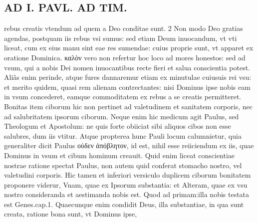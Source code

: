 \documentclass{article}
\begin{document}
\begin{pages}
\section*{AD I. PAVL. AD TIM. }
\marginpar{[ p.196 ]}\pstart rebus creatis vtendum ad quem a Deo conditae sunt. 2 Non modo Deo gratias agendas, postquam iis rebus vsi sumus: sed etiam Deum inuocandum, vt vti liceat, cum ex eius manu sint eae res sumendae: cuius proprie sunt, vt apparet ex oratione Dominica. καλὸν vero non refertur hoc loco ad mores honestos: sed ad vsum, qui a nobis Dei nomen inuocantibus recte fieri et salua conscientia potest. Aliâs enim perinde, atque fures dannaremur etiam ex minutulae cuiusuis rei vsu: et merito quidem, quasi rem alienam contrectantes: nisi Dominus ipse nobis eam in vsum concederet, eamque commoditatem ex rebus a se creatis permitteret. Bonitas item ciborum hic non pertinet ad valetudinem et sanitatem corporis, nec ad salubritatem ipsorum ciborum. Neque enim hic medicum agit Paulus, sed Theologum et Apostolum: ne quis forte obiiciat sibi aliquos cibos non esse salubres, dum iis vtitur. Atque propterea hunc Pauli locum calumnietur, quia generaliter dicit Paulus οὐδεν ἀπόβλητον, id est, nihil esse reiiciendum ex iis, quae Dominus in vsum et cibum hominum creauit. Quid enim liceat conscientiae nostrae ratione spectat Paulus, non autem quid conferat stomacho nostro, vel valetudini corporis. Hic tamen et inferiori versiculo duplicem ciborum bonitatem proponere viderur, Vnam, quae ex Ipsorum substantia: et Alteram, quae ex vsu nostro consideranda et aestimanda nobis est. Quod ad primam:illa nobis testata est Genes.cap.1. Quaecunque enim condidit Deus, illa substantiae, in qua sunt creata, ratione bona sunt, vt Dominus ipse,  \pend

\end{pages}
\end{document}
